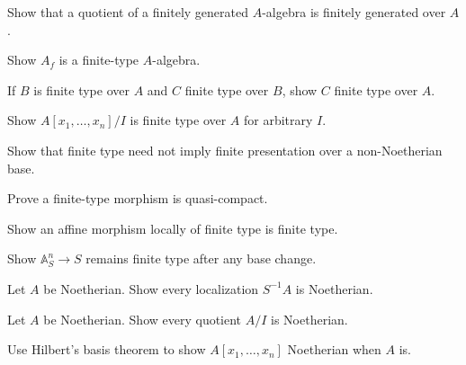 \begin{exercise}\label{exr:vi26-01}Show that a quotient of a finitely generated $A$-algebra is finitely generated over $A$.\end{exercise}

\begin{exercise}\label{exr:vi26-02}Show $A_f$ is a finite-type $A$-algebra.\end{exercise}

\begin{exercise}\label{exr:vi26-03}If $B$ is finite type over $A$ and $C$ finite type over $B$, show $C$ finite type over $A$.\end{exercise}

\begin{exercise}\label{exr:vi26-04}Show $A[x_1,\dots,x_n]/I$ is finite type over $A$ for arbitrary $I$.\end{exercise}

\begin{exercise}\label{exr:vi26-05}Show that finite type need not imply finite presentation over a non-Noetherian base.\end{exercise}

\begin{exercise}\label{exr:vi26-06}Prove a finite-type morphism is quasi-compact.\end{exercise}

\begin{exercise}\label{exr:vi26-07}Show an affine morphism locally of finite type is finite type.\end{exercise}

\begin{exercise}\label{exr:vi26-08}Show $\mathbb A^n_S\to S$ remains finite type after any base change.\end{exercise}

\begin{exercise}\label{exr:vi26-09}Let $A$ be Noetherian. Show every localization $S^{-1}A$ is Noetherian.\end{exercise}

\begin{exercise}\label{exr:vi26-10}Let $A$ be Noetherian. Show every quotient $A/I$ is Noetherian.\end{exercise}

\begin{exercise}\label{exr:vi26-11}Use Hilbert's basis theorem to show $A[x_1,\dots,x_n]$ Noetherian when $A$ is.\end{exercise}

